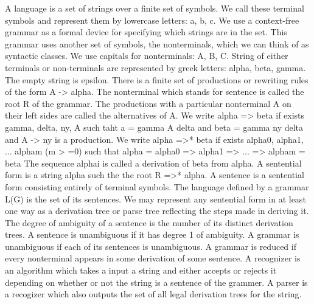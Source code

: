 \begin{isabellebody}
\begin{isamarkuptext}
A language is a set of strings over a finite set of symbols. We call these terminal symbols and represent
them by lowercase letters: a, b, c. We use a context-free grammar as a formal device for specifying which
strings are in the set. This grammar uses another set of symbols, the nonterminals, which we can think of
as syntactic classes. We use capitals for nonterminals: A, B, C. String of either terminals or non-terminals
are represented by greek letters: alpha, beta, gamma. The empty string is epsilon. There is a finite set of
productions or rewriting rules of the form A -> alpha. The nonterminal which stands for sentence is called the
root R of the grammar. The productions with a particular nonterminal A on their left sides are called the
alternatives of A. We write alpha => beta if exists gamma, delta, ny, A such taht a = gamma A delta and
beta = gamma ny delta and A -> ny is a production. We write alpha =>* beta if exists alpha0, alpha1, ...
alpham (m > =0) such that alpha = alpha0 => alpha1 => ... => alpham = beta The sequence alphai is called a
derivation of beta from alpha. A sentential form is a string alpha such the the root R =>* alpha. A sentence
is a sentential form consisting entirely of terminal symbols. The language defined by a grammar L(G) is the
set of its sentences. We may represent any sentential form in at least one way as a derivation tree or parse
tree reflecting the steps made in deriving it. The degree of ambiguity of a sentence is the number of its
distinct derivation trees. A sentence is unambiguous if it has degree 1 of ambiguity. A grammar is unambiguous
if each of its sentences is unambiguous. A grammar is reduced if every nonterminal appears in some derivation
of some sentence. A recognizer is an algorithm which takes a input a string and either accepts or rejects it
depending on whether or not the string is a sentence of the grammer. A parser is a recogizer which also outputs
the set of all legal derivation trees for the string.


\end{isamarkuptext}
\end{isabellebody}
